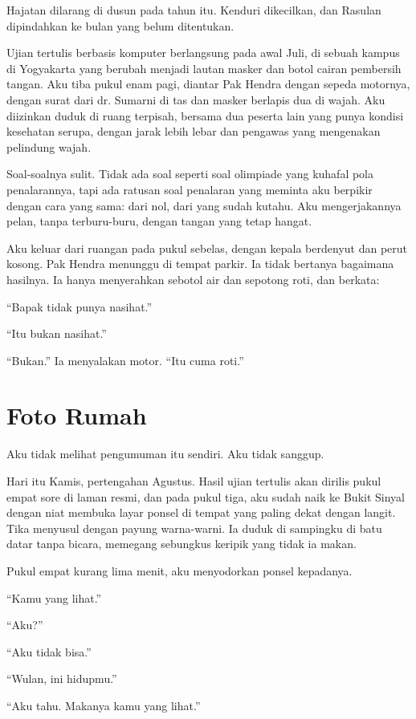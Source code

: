 \documentclass[11pt,twoside,openany]{book}
\makeatletter
\newcommand{\scenebreak}{\par\vspace{0.9em}{\centering\textsc{*\hspace{0.7em}*\hspace{0.7em}*}\par}\vspace{0.9em}\@afterindentfalse\@afterheading}
\makeatother
\begin{document}
\scenebreak
Hajatan dilarang di dusun pada tahun itu. Kenduri dikecilkan, dan Rasulan dipindahkan ke bulan yang belum ditentukan.

Ujian tertulis berbasis komputer berlangsung pada awal Juli, di sebuah kampus di Yogyakarta yang berubah menjadi lautan masker dan botol cairan pembersih tangan. Aku tiba pukul enam pagi, diantar Pak Hendra dengan sepeda motornya, dengan surat dari dr. Sumarni di tas dan masker berlapis dua di wajah. Aku diizinkan duduk di ruang terpisah, bersama dua peserta lain yang punya kondisi kesehatan serupa, dengan jarak lebih lebar dan pengawas yang mengenakan pelindung wajah.

Soal-soalnya sulit. Tidak ada soal seperti soal olimpiade yang kuhafal pola penalarannya, tapi ada ratusan soal penalaran yang meminta aku berpikir dengan cara yang sama: dari nol, dari yang sudah kutahu. Aku mengerjakannya pelan, tanpa terburu-buru, dengan tangan yang tetap hangat.

Aku keluar dari ruangan pada pukul sebelas, dengan kepala berdenyut dan perut kosong. Pak Hendra menunggu di tempat parkir. Ia tidak bertanya bagaimana hasilnya. Ia hanya menyerahkan sebotol air dan sepotong roti, dan berkata:

``Bapak tidak punya nasihat.''

``Itu bukan nasihat.''

``Bukan.'' Ia menyalakan motor. ``Itu cuma roti.''

\chapter{Foto Rumah}
Aku tidak melihat pengumuman itu sendiri. Aku tidak sanggup.

Hari itu Kamis, pertengahan Agustus. Hasil ujian tertulis akan dirilis pukul empat sore di laman resmi, dan pada pukul tiga, aku sudah naik ke Bukit Sinyal dengan niat membuka layar ponsel di tempat yang paling dekat dengan langit. Tika menyusul dengan payung warna-warni. Ia duduk di sampingku di batu datar tanpa bicara, memegang sebungkus keripik yang tidak ia makan.

Pukul empat kurang lima menit, aku menyodorkan ponsel kepadanya.

``Kamu yang lihat.''

``Aku?''

``Aku tidak bisa.''

``Wulan, ini hidupmu.''

``Aku tahu. Makanya kamu yang lihat.''
\end{document}
